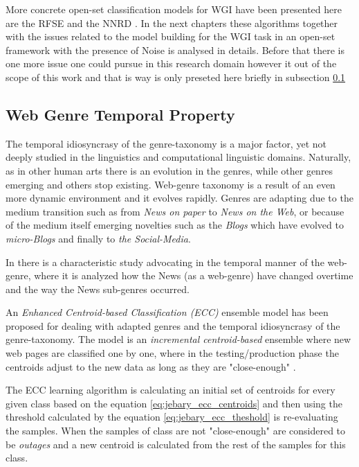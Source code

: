More concrete open-set classification models for WGI have been presented here are the RFSE and the NNRD . In the  next chapters these algorithms together with the issues related to the model building for the WGI task in an open-set framework with the presence of Noise is analysed in details. Before that there is one more issue one could pursue in this research domain however it out of the scope of this work and that is way is only preseted here briefly in subsection \ref{chap:relevant_work:sec:temporal_wgi}

\subsection{Web Genre Temporal Property}
\label{chap:relevant_work:sec:temporal_wgi}
The temporal idiosyncrasy of the genre-taxonomy is a major factor, yet not deeply studied in the linguistics and computational linguistic domains. Naturally, as in other human arts there is an evolution in the genres, while other genres emerging and others stop existing. Web-genre taxonomy is a result of an even more dynamic environment and it evolves rapidly. Genres are adapting due to the medium transition such as from \textit{News on paper} to \textit{News on the Web}, or because of the medium itself emerging novelties such as the \textit{Blogs} which have evolved to\textit{ micro-Blogs} and finally to \textit{the Social-Media}. 

In \parencite{caple2017genre} there is a characteristic study advocating in the temporal manner of the web-genre, where it is analyzed how the News (as a web-genre) have changed overtime and the way the News sub-genres occurred.

An \textit{Enhanced Centroid-based Classification (ECC)} ensemble model has been proposed for dealing with adapted genres and the temporal idiosyncrasy of the genre-taxonomy. The model is an \textit{incremental centroid-based} ensemble where new web pages are classified one by one, where in the testing/production phase the centroids adjust to the new data as long as they are "close-enough" \parencite{jebari2015combination}.

The ECC learning algorithm is calculating an initial set of centroids for every given class based on the equation \ref{eq:jebary_ecc_centroids} and then using the threshold calculated by the equation \ref{eq:jebary_ecc_theshold} is re-evaluating the samples. When the samples of  class are not "close-enough" are considered to be \textit{outages} and a new centroid is calculated from the rest of the samples for this class. 

